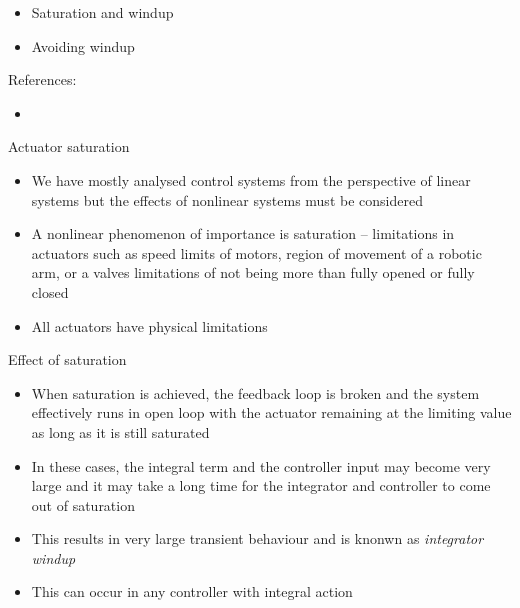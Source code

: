 \documentclass{beamer-control}
\begin{document}

\begin{SUMMARY}
\begin{itemize}
\item Saturation and windup
\item Avoiding windup
\end{itemize}
\vfill References:
\begin{itemize}
\item {}
\end{itemize}
\end{SUMMARY}




\begin{frame}{Actuator saturation}
\begin{itemize}
\item We have mostly analysed control systems from the perspective of linear systems but the effects of nonlinear systems must be considered
\item A nonlinear phenomenon of importance is saturation -- limitations in actuators such as speed limits of motors, region of movement of a robotic arm, or a valves limitations of not being more than fully opened or fully closed
\item All actuators have physical limitations
\end{itemize}
\end{frame}

\begin{frame}{Effect of saturation}
\begin{itemize}
\item When saturation is achieved, the feedback loop is broken and the system effectively runs in open loop with the actuator remaining at the limiting value as long as it is still saturated
\item In these cases, the integral term and the controller input may become very large and it may take a long time for the integrator and controller to come out of saturation
\item This results in very large transient behaviour and is knonwn as \textit{integrator windup}
\item This can occur in any controller with integral action
\end{itemize}
\end{frame}
\end{document}
